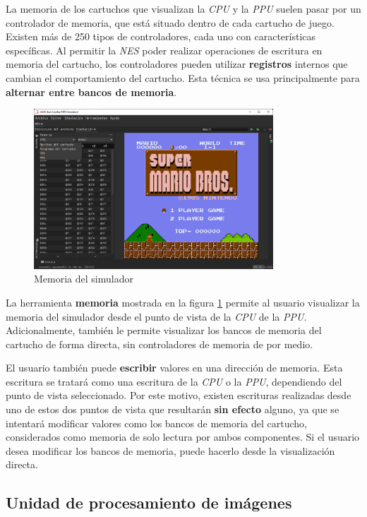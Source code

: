 La memoria de los cartuchos que visualizan la \textit{CPU}
y la \textit{PPU} suelen pasar por un controlador de memoria,
que está situado dentro de cada cartucho
de juego.
Existen más de 250 tipos de controladores, cada
uno con características específicas.
Al permitir la \textit{NES} poder realizar operaciones de
escritura en memoria del cartucho, los controladores
pueden utilizar \textbf{registros} internos que cambian
el comportamiento del cartucho.
Esta técnica se usa principalmente para \textbf{alternar
entre bancos de memoria}.

\begin{figure}[h]
    \centering
    \includegraphics[width=0.8\textwidth]{images/nes/nes-memory}
    \caption{Memoria del simulador}
    \label{fig:nes-memory}
\end{figure}

La herramienta \textbf{memoria} mostrada en la
figura \ref{fig:nes-memory} permite
al usuario visualizar la memoria del simulador desde
el punto de vista de la \textit{CPU} de la \textit{PPU}.
Adicionalmente, también le permite visualizar los bancos
de memoria del cartucho de forma directa, sin controladores
de memoria de por medio.

El usuario también puede \textbf{escribir} valores en una
dirección de memoria.
Esta escritura se tratará como una escritura de la \textit{CPU}
o la \textit{PPU}, dependiendo del punto de vista seleccionado.
Por este motivo, existen escrituras realizadas desde uno de estos
dos puntos de vista que resultarán \textbf{sin efecto} alguno,
ya que se intentará modificar valores como los bancos de memoria
del cartucho, considerados como memoria de solo
lectura por ambos componentes.
Si el usuario desea modificar los bancos de memoria, puede
hacerlo desde la visualización directa.

\subsection{Unidad de procesamiento de imágenes}\label{subsec:unidad-de-procesamiento-de-imagenes}

